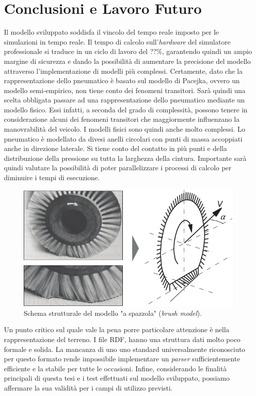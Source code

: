 \chapter{Conclusioni e Lavoro Futuro}
\label{Conclusione}
%
Il modello sviluppato soddisfa il vincolo del tempo reale imposto per le simulazioni in tempo reale. Il tempo di calcolo sull'\textit{hardware} del simulatore professionale si traduce in un ciclo di lavoro del ??\%, garantendo quindi un ampio margine di sicurezza e dando la possibilità di aumentare la precisione del modello attraverso l'implementazione di modelli più complessi. Certamente, dato che la rappresentazione dello pneumatico è basato sul modello di Pacejka, ovvero un modello semi-empirico, non tiene conto dei fenomeni transitori. Sarà quindi una scelta obbligata passare ad una rappresentazione dello pneumatico mediante un modello fisico. Essi infatti, a seconda del grado di complessità, possono tenere in considerazione alcuni dei fenomeni transitori che maggiormente influenzano la manovrabilità del veicolo. I modelli fisici sono quindi anche molto complessi. Lo pneumatico è modellato da divesi anelli circolari con punti di massa accoppiati anche in direzione laterale. Si tiene conto del contatto in più punti e della distribuzione della pressione su tutta la larghezza della cintura. Importante sarà quindi valutare la possibilità di poter parallelizzare i processi di calcolo per diminuire i tempi di esecuzione.

\begin{figure}
	\centering
	\includegraphics[width=0.7\linewidth]{Figures/brush_model}
	\caption{Schema strutturale del modello "a spazzola" (\textit{brush model}). }
	\label{brushmodel}
\end{figure}

Un punto critico sul quale vale la pena porre particolare attenzione è nella rappresentazione del terreno. I file \ac{RDF}, hanno una struttura dati molto poco formale e solida. La mancanza di uno uno standard universalmente riconosciuto per questo formato rende impossibile implementare un \textit{parser} sufficientemente efficiente e la stabile per tutte le occasioni.
Infine, considerando le finalità principali di questa tesi e i test effettuati sul modello sviluppato, possiamo affermare la sua validità per i campi di utilizzo previsti.





